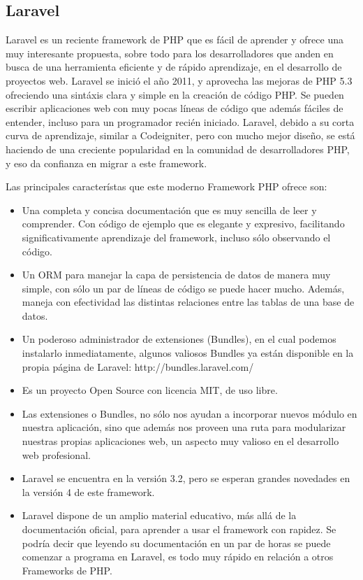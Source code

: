 \subsection{Laravel}

Laravel es un reciente framework de PHP que es fácil de aprender y ofrece una muy interesante propuesta, sobre todo para los desarrolladores que anden en busca de una herramienta eficiente y de rápido aprendizaje, en el desarrollo de proyectos web.
Laravel se inició el año 2011, y aprovecha las mejoras de PHP 5.3 ofreciendo una sintáxis clara y simple en la creación de código PHP. Se pueden escribir aplicaciones web con muy pocas líneas de código que además fáciles de entender, incluso para un programador recién iniciado.
Laravel, debido a su corta curva de aprendizaje, similar a Codeigniter, pero con mucho mejor diseño, se está haciendo de una creciente popularidad en la comunidad de desarrolladores PHP, y eso da confianza en migrar a este framework.

Las principales característas que este moderno Framework PHP ofrece son:


\begin{itemize}

\item Una completa y concisa documentación que es muy sencilla de leer y comprender. Con código de ejemplo que es elegante y expresivo, facilitando significativamente aprendizaje del framework, incluso sólo observando el código.
\item Un ORM para manejar la capa de persistencia de datos de manera muy simple, con sólo un par de líneas de código se puede hacer mucho. Además, maneja con efectividad las distintas relaciones entre las tablas de una base de datos.
\item Un poderoso administrador de extensiones (Bundles), en el cual podemos instalarlo inmediatamente, algunos valiosos Bundles ya están disponible en la propia página de Laravel: http://bundles.laravel.com/
\item Es un proyecto Open Source con licencia MIT, de uso libre.
\item Las extensiones o Bundles, no sólo nos ayudan a incorporar nuevos módulo en nuestra aplicación, sino que además nos proveen una ruta para modularizar nuestras propias aplicaciones web, un aspecto muy valioso en el desarrollo web profesional.
\item Laravel se encuentra en la versión 3.2, pero se esperan grandes novedades en la versión 4 de este framework. 
\item Laravel dispone de un amplio material educativo, más allá de la documentación oficial, para aprender a usar el framework con rapidez. Se podría decir que leyendo su documentación en un par de horas se puede comenzar a programa en Laravel, es todo muy rápido en relación a otros Frameworks de PHP.

\end{itemize}